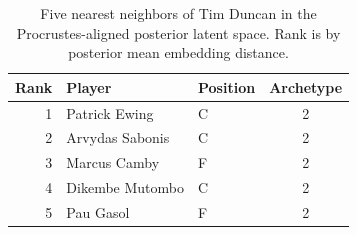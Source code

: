 \begin{table}[htbp]
  \centering\small
  \begin{tabular}{rllc}
    \toprule
    Rank & Player & Position & Archetype \\
    \midrule
    1 & Patrick Ewing & C & 2 \\
    2 & Arvydas Sabonis & C & 2 \\
    3 & Marcus Camby & F & 2 \\
    4 & Dikembe Mutombo & C & 2 \\
    5 & Pau Gasol & F & 2 \\
    \bottomrule
  \end{tabular}
  \caption{Five nearest neighbors of Tim Duncan in the Procrustes-aligned posterior latent space. Rank is by posterior mean embedding distance.}
  \label{tab:Tim_Duncan_neighbors}
\end{table}

